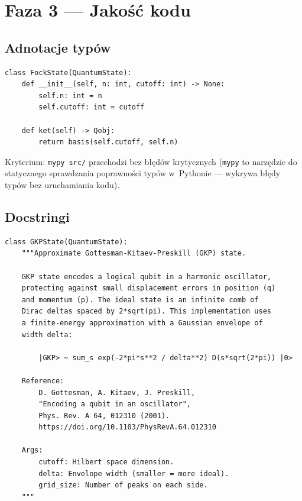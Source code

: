 \documentclass[12pt,a4paper]{article}
\begin{document}
\section{Faza 3 --- Jakość kodu}
\label{sec:faza3}

\subsection{Adnotacje typów}

\begin{lstlisting}[caption={Przykład adnotacji typów dla \texttt{FockState}.}, label={lst:types}]
class FockState(QuantumState):
    def __init__(self, n: int, cutoff: int) -> None:
        self.n: int = n
        self.cutoff: int = cutoff

    def ket(self) -> Qobj:
        return basis(self.cutoff, self.n)
\end{lstlisting}

Kryterium: \texttt{mypy src/} przechodzi bez błędów krytycznych (\texttt{mypy} to narzędzie do statycznego sprawdzania poprawności typów w~Pythonie --- wykrywa błędy typów bez uruchamiania kodu).

\subsection{Docstringi}

\begin{lstlisting}[caption={Przykładowy docstring z referencją do literatury (GKP).}, label={lst:docstring-gkp}]
class GKPState(QuantumState):
    """Approximate Gottesman-Kitaev-Preskill (GKP) state.

    GKP state encodes a logical qubit in a harmonic oscillator,
    protecting against small displacement errors in position (q)
    and momentum (p). The ideal state is an infinite comb of
    Dirac deltas spaced by 2*sqrt(pi). This implementation uses
    a finite-energy approximation with a Gaussian envelope of
    width delta:

        |GKP> ~ sum_s exp(-2*pi*s**2 / delta**2) D(s*sqrt(2*pi)) |0>

    Reference:
        D. Gottesman, A. Kitaev, J. Preskill,
        "Encoding a qubit in an oscillator",
        Phys. Rev. A 64, 012310 (2001).
        https://doi.org/10.1103/PhysRevA.64.012310

    Args:
        cutoff: Hilbert space dimension.
        delta: Envelope width (smaller = more ideal).
        grid_size: Number of peaks on each side.
    """
\end{lstlisting}
\end{document}
